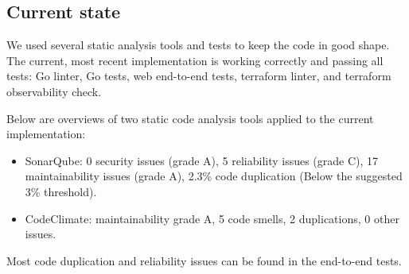 
\subsection{Current state} %
We used several static analysis tools and tests to keep the code in good shape. The current, most recent implementation is working correctly and passing all tests: Go linter, Go tests, web end-to-end tests, terraform linter, and terraform observability check.

Below are overviews of two static code analysis tools applied to the current implementation:
\begin{itemize}
    \item SonarQube: 0 security issues (grade A), 5 reliability issues
    (grade C), 17 maintainability issues (grade A), 2.3\% code duplication
    (Below the suggested 3\% threshold).
    \item CodeClimate: maintainability grade A, 5 code smells, 2 duplications,
    0 other issues.
\end{itemize}

Most code duplication and reliability issues can be found in the end-to-end tests.

